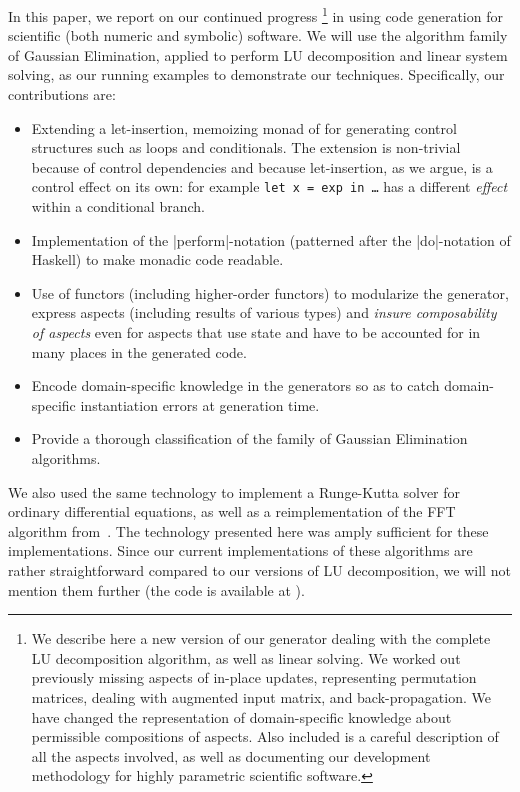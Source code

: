 \documentclass{elsart}
\begin{document}
In this paper, we report on our continued progress \cite{CaretteKiselyov05}%
\footnote{We describe here a new version of our generator
  dealing with the complete LU decomposition algorithm, as well as
  linear solving. We worked out previously missing aspects of in-place
  updates, representing permutation matrices, dealing with augmented 
  input matrix, and back-propagation. We have changed the representation
  of domain-specific knowledge about permissible compositions of aspects.
  Also included is a careful description of all the aspects involved, as
  well as documenting our development methodology for highly parametric
  scientific software.}
in using code generation for scientific (both numeric and symbolic)
software.  We will use the algorithm family of Gaussian Elimination, 
applied to perform LU decomposition 
and linear system solving, as our running examples to demonstrate our
techniques.  Specifically, our contributions are:
\begin{itemize}
    \item Extending a let-insertion, memoizing monad of
      \cite{KiselyovTaha,SwadiMonadic06} for generating control structures
      such as loops and conditionals. The extension is non-trivial
      because of control dependencies and because let-insertion, as we argue,
      is a control effect on its own: for example
      \texttt{let x = exp in \dots} has a different \emph{effect} within a
      conditional branch.
    \item Implementation of the |perform|-notation (patterned after
      the |do|-notation of Haskell) to make monadic code readable.
    \item Use of functors (including higher-order functors) to
      modularize the generator, express aspects (including results of
      various types) and \emph{insure composability of aspects} even
      for aspects that use state and have to be accounted for in many
      places in the generated code.
    \item Encode domain-specific knowledge in the generators so as to
      catch domain-specific instantiation errors at generation
      time.
    \item Provide a thorough classification of the family of Gaussian
    Elimination algorithms.
\end{itemize}

We also used the same technology to implement a Runge-Kutta solver for
ordinary differential equations, as well as a reimplementation of
the FFT algorithm from~\cite{KiselyovTaha}.  The technology presented
here was amply sufficient for these implementations.  Since our current
implementations of these algorithms are rather straightforward compared to 
our versions of LU decomposition, we will not mention them further 
(the code is available at \cite{metamonadsURL}).
\end{document}
